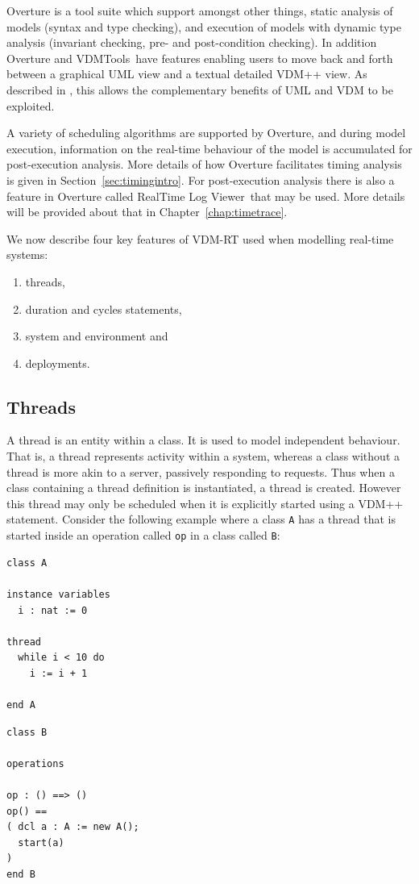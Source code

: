 \documentclass{overturerepchap}
\newcommand{\vdmtools}{VDMTools}
\newcommand{\showtrace}{RealTime Log Viewer}
\begin{document}
Overture is a tool suite which support amongst other
things, static analysis of models (syntax and type checking), and
execution of models with dynamic type analysis (invariant checking,
pre- and post-condition checking). In addition Overture and
\vdmtools\ have features enabling users to move back and forth between
a graphical UML view and a textual detailed VDM++ view. As described
in \cite{Guidelines}, this allows the complementary benefits of UML
and VDM to be exploited.

A variety of scheduling algorithms are supported by Overture,
and during model execution, information on the real-time behaviour of
the model is accumulated for post-execution analysis. More details of
how Overture facilitates timing analysis is given in
Section~\ref{sec:timingintro}. For post-execution analysis there is also
a feature in Overture
called \showtrace\ that may be used. More details will be
provided about that in Chapter~\ref{chap:timetrace}.

We now describe four key features of VDM-RT used when modelling
real-time systems: 
\begin{enumerate}
\item threads,
\item duration and cycles statements,
\item system and environment and
\item deployments.
\end{enumerate}

\subsection{Threads}

A thread is an entity within a class. It is used to model independent
behaviour. That is, a thread represents activity within a system,
whereas a class without a thread is more akin to a server, passively
responding to requests. Thus when a class containing a thread
definition is instantiated, a thread is created. However this thread
may only be scheduled when it is explicitly started using a VDM++
{\bf{}} statement. Consider the following example where a class
\texttt{A} has a thread that is started inside an operation called 
\texttt{op} in a class called \texttt{B}:

\begin{multicols}{2}
\begin{lstlisting}
class A

instance variables
  i : nat := 0

thread
  while i < 10 do
    i := i + 1

end A
\end{lstlisting}
\begin{lstlisting}
class B

operations

op : () ==> ()
op() ==
( dcl a : A := new A();
  start(a)
)
end B
\end{lstlisting}
\end{multicols}
\end{document}
